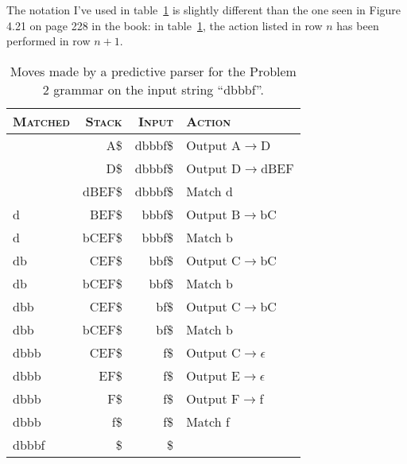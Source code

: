 The notation I've used in table~\ref{tab:2c} is slightly different than the one seen in Figure 4.21 on page 228 in the book:
in table~\ref{tab:2c}, the action listed in row $n$ has been performed in row $n+1$.


\begin{table}[H]
\begin{center}
\begin{tabular}{lrrl}
	\hline \hline
	\textsc{Matched} & \textsc{Stack} 	& \textsc{Input}	& \textsc{Action}	\\ \hline
					 & A\$				& dbbbf\$			& Output A$\rightarrow$D		\\
					 & D\$				& dbbbf\$			& Output D$\rightarrow$dBEF	\\
					 & dBEF\$			& dbbbf\$			& Match d		  	\\ 
	d				 & BEF\$			& bbbf\$			& Output B$\rightarrow$bC		\\
	d				 & bCEF\$			& bbbf\$			& Match b			\\
	db				 & CEF\$			& bbf\$				& Output C$\rightarrow$bC		\\
	db				 & bCEF\$			& bbf\$				& Match b			\\
	dbb				 & CEF\$			& bf\$				& Output C$\rightarrow$bC		\\
	dbb				 & bCEF\$			& bf\$				& Match b			\\
	dbbb			 & CEF\$			& f\$				& Output C$\rightarrow\epsilon$		\\
	dbbb			 & EF\$				& f\$				& Output E$\rightarrow\epsilon$		\\
	dbbb			 & F\$				& f\$				& Output F$\rightarrow$f		\\
	dbbb			 & f\$				& f\$				& Match f			\\
	dbbbf			 & \$				& \$				& 					\\ \hline					
\end{tabular}
\caption{Moves made by a predictive parser for the Problem 2 grammar on the input string ``dbbbf''.}
\label{tab:2c}
\end{center}
\end{table}

